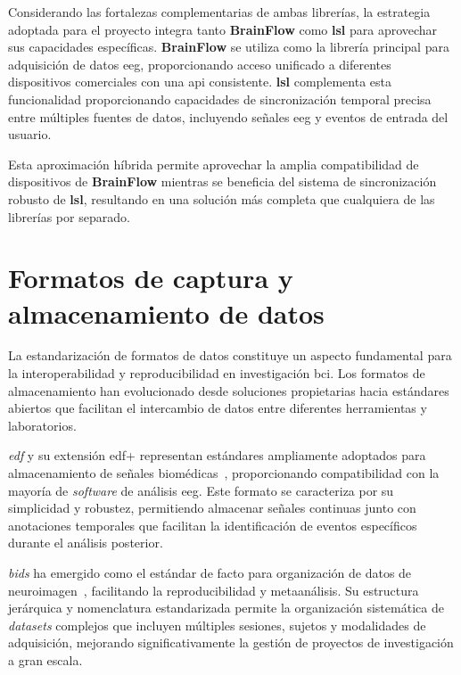 Considerando las fortalezas complementarias de ambas librerías, la estrategia adoptada para el proyecto integra tanto \textbf{BrainFlow} como \textbf{\acrshort{lsl}} para aprovechar sus capacidades específicas. \textbf{BrainFlow} se utiliza como la librería principal para adquisición de datos \acrshort{eeg}, proporcionando acceso unificado a diferentes dispositivos comerciales con una \acrshort{api} consistente. \textbf{\acrshort{lsl}} complementa esta funcionalidad proporcionando capacidades de sincronización temporal precisa entre múltiples fuentes de datos, incluyendo señales \acrshort{eeg} y eventos de entrada del usuario.

Esta aproximación híbrida permite aprovechar la amplia compatibilidad de dispositivos de \textbf{BrainFlow} mientras se beneficia del sistema de sincronización robusto de \textbf{\acrshort{lsl}}, resultando en una solución más completa que cualquiera de las librerías por separado.

\section{Formatos de captura y almacenamiento de datos}
\label{sec:formatos_captura}

La estandarización de formatos de datos constituye un aspecto fundamental para la interoperabilidad y reproducibilidad en investigación \acrshort{bci}. Los formatos de almacenamiento han evolucionado desde soluciones propietarias hacia estándares abiertos que facilitan el intercambio de datos entre diferentes herramientas y laboratorios.

\textit{\acrfull{edf}} y su extensión \acrshort{edf+} representan estándares ampliamente adoptados para almacenamiento de señales biomédicas~\cite{kemp2003european}, proporcionando compatibilidad con la mayoría de \textit{software} de análisis \acrshort{eeg}. Este formato se caracteriza por su simplicidad y robustez, permitiendo almacenar señales continuas junto con anotaciones temporales que facilitan la identificación de eventos específicos durante el análisis posterior.

\textit{\acrfull{bids}} ha emergido como el estándar de facto para organización de datos de neuroimagen~\cite{bids}, facilitando la reproducibilidad y metaanálisis. Su estructura jerárquica y nomenclatura estandarizada permite la organización sistemática de \textit{\glspl{dataset}} complejos que incluyen múltiples sesiones, sujetos y modalidades de adquisición, mejorando significativamente la gestión de proyectos de investigación a gran escala.

